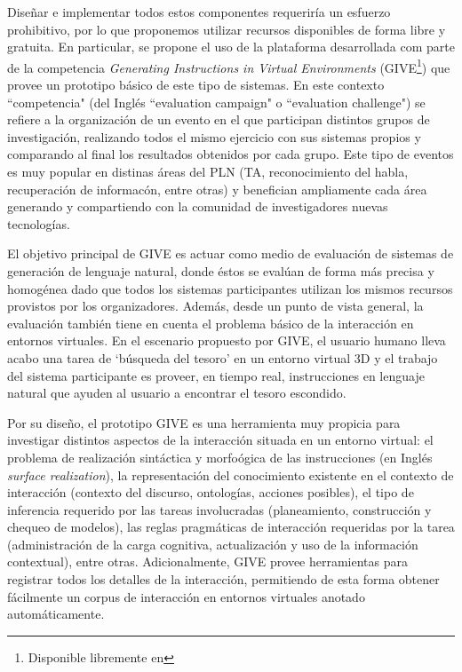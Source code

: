 Dise\~nar e implementar todos estos componentes requerir\'ia un esfuerzo prohibitivo, por lo que proponemos utilizar recursos disponibles de forma libre y gratuita. En particular, se propone el uso de la plataforma desarrollada com parte de la competencia \textit{Generating Instructions in Virtual Environments} (GIVE\footnote{Disponible libremente en  }) que
provee un prototipo b\'asico de este tipo de sistemas. En este contexto ``competencia" (del Ingl\'es ``evaluation campaign" o ``evaluation challenge") se refiere a la organizaci\'on de un evento en el que participan distintos grupos de investigaci\'on, realizando todos el mismo ejercicio con sus sistemas propios y comparando al final los resultados obtenidos por cada grupo. Este tipo de eventos es muy popular en distinas \'areas del PLN (TA, reconocimiento del habla, recuperaci\'on de informac\'on, entre otras) y benefician ampliamente cada \'area generando y compartiendo con la comunidad de investigadores nuevas tecnolog\'ias.

El objetivo principal de GIVE es actuar como medio de evaluaci\'on de sistemas de generaci\'on
de lenguaje natural, donde \'estos se eval\'uan de forma m\'as precisa y homog\'enea dado que todos los sistemas participantes utilizan los mismos recursos provistos por los organizadores. Adem\'as, desde un punto de vista general, la evaluaci\'on
tambi\'en tiene en cuenta el problema b\'asico de la interacci\'on en
entornos virtuales.  En el escenario propuesto por GIVE, el usuario
humano lleva acabo una tarea de `b\'usqueda del tesoro' en un entorno
virtual 3D y el trabajo del sistema participante es proveer, en tiempo
real, instrucciones en lenguaje natural que ayuden al usuario
a encontrar el tesoro escondido.


Por su dise\~no, el prototipo GIVE es una herramienta muy propicia para investigar distintos aspectos de la interacci\'on situada en un entorno virtual:
el problema de realizaci\'on sint\'actica y morfo\'ogica de las
instrucciones (en Ingl\'es \emph{surface realization}),
la representaci\'on del conocimiento existente en el contexto de
interacci\'on (contexto del discurso, ontolog\'ias, acciones posibles),
el tipo de inferencia requerido por las tareas involucradas
(planeamiento, construcci\'on y chequeo de modelos),
las reglas pragm\'aticas de interacci\'on requeridas por la tarea
(administraci\'on de la carga cognitiva, actualizaci\'on y uso de la informaci\'on contextual), entre otras. Adicionalmente, GIVE provee herramientas para registrar todos los detalles de la
interacci\'on, permitiendo de esta forma obtener f\'acilmente un corpus de interacci\'on en entornos virtuales anotado autom\'aticamente. 


